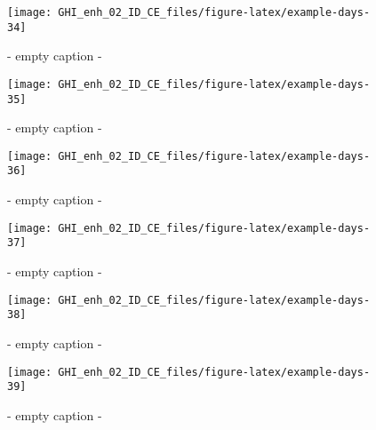 \documentclass[
  10pt,
  a4paper,oneside]{article}
\begin{document}
\begin{figure}[H]

{\centering \texttt{[image: GHI\_enh\_02\_ID\_CE\_files/figure-latex/example-days-34]} 

}

\caption{ - empty caption - }\label{fig:example-days-34}
\end{figure}

\begin{figure}[H]

{\centering \texttt{[image: GHI\_enh\_02\_ID\_CE\_files/figure-latex/example-days-35]} 

}

\caption{ - empty caption - }\label{fig:example-days-35}
\end{figure}

\begin{figure}[H]

{\centering \texttt{[image: GHI\_enh\_02\_ID\_CE\_files/figure-latex/example-days-36]} 

}

\caption{ - empty caption - }\label{fig:example-days-36}
\end{figure}

\begin{figure}[H]

{\centering \texttt{[image: GHI\_enh\_02\_ID\_CE\_files/figure-latex/example-days-37]} 

}

\caption{ - empty caption - }\label{fig:example-days-37}
\end{figure}

\begin{figure}[H]

{\centering \texttt{[image: GHI\_enh\_02\_ID\_CE\_files/figure-latex/example-days-38]} 

}

\caption{ - empty caption - }\label{fig:example-days-38}
\end{figure}

\begin{figure}[H]

{\centering \texttt{[image: GHI\_enh\_02\_ID\_CE\_files/figure-latex/example-days-39]} 

}

\caption{ - empty caption - }\label{fig:example-days-39}
\end{figure}
\end{document}
